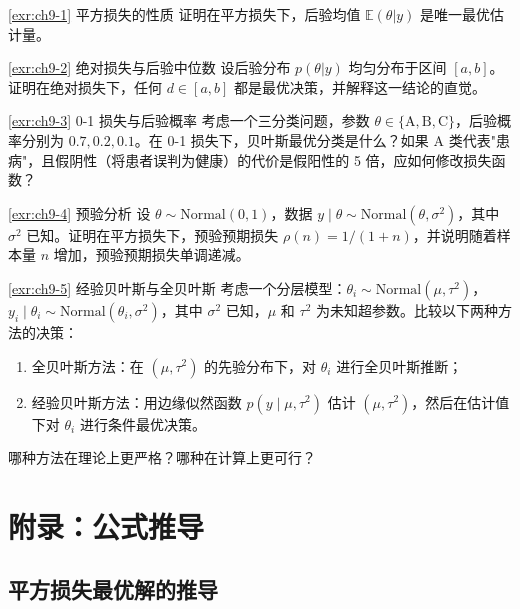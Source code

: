 \begin{Exercise}{\ref{exr:ch9-1} 平方损失的性质}
证明在平方损失下，后验均值 $\mathbb{E}(\theta | y)$ 是唯一最优估计量。
\end{Exercise}

\begin{Exercise}{\ref{exr:ch9-2} 绝对损失与后验中位数}
设后验分布 $p(\theta | y)$ 均匀分布于区间 $[a, b]$。证明在绝对损失下，任何 $d \in [a, b]$ 都是最优决策，并解释这一结论的直觉。
\end{Exercise}

\begin{Exercise}{\ref{exr:ch9-3} 0-1 损失与后验概率}
考虑一个三分类问题，参数 $\theta \in \{\text{A}, \text{B}, \text{C}\}$，后验概率分别为 $0.7, 0.2, 0.1$。在 0-1 损失下，贝叶斯最优分类是什么？如果 A 类代表"患病"，且假阴性（将患者误判为健康）的代价是假阳性的 5 倍，应如何修改损失函数？
\end{Exercise}

\begin{Exercise}{\ref{exr:ch9-4} 预验分析}
设 $\theta \sim \text{Normal}(0, 1)$，数据 $y \mid \theta \sim \text{Normal}(\theta, \sigma^2)$，其中 $\sigma^2$ 已知。证明在平方损失下，预验预期损失 $\rho(n) = 1 / (1 + n)$，并说明随着样本量 $n$ 增加，预验预期损失单调递减。
\end{Exercise}

\begin{Exercise}{\ref{exr:ch9-5} 经验贝叶斯与全贝叶斯}
考虑一个分层模型：$\theta_i \sim \text{Normal}(\mu, \tau^2)$，$y_i \mid \theta_i \sim \text{Normal}(\theta_i, \sigma^2)$，其中 $\sigma^2$ 已知，$\mu$ 和 $\tau^2$ 为未知超参数。比较以下两种方法的决策：
\begin{enumerate}
  \item 全贝叶斯方法：在 $(\mu, \tau^2)$ 的先验分布下，对 $\theta_i$ 进行全贝叶斯推断；
  \item 经验贝叶斯方法：用边缘似然函数 $p(y \mid \mu, \tau^2)$ 估计 $(\mu, \tau^2)$，然后在估计值下对 $\theta_i$ 进行条件最优决策。
\end{enumerate}
哪种方法在理论上更严格？哪种在计算上更可行？
\end{Exercise}

\section{附录：公式推导}\label{sec:appendix-ch9}

\subsection{平方损失最优解的推导}\label{sec:derivation-squared-loss}

